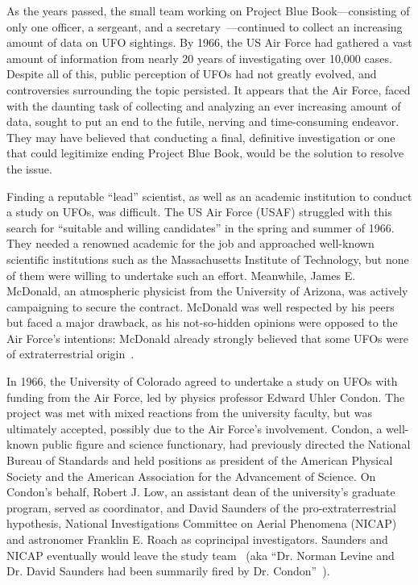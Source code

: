 As the years passed, the small team working on Project Blue Book---consisting of only one officer,
a sergeant, and a secretary~\cite{Condon-report,Condon-report-Bantam,Condon-report-Dutton,BibEntry2023Jan}---continued to collect
an increasing amount of data on UFO sightings. By 1966, the US Air Force had gathered a vast amount of information from nearly 20
years of investigating over 10,000 cases.
Despite all of this,
public perception of UFOs had not greatly evolved, and controversies surrounding the topic persisted.
It appears that the Air Force, faced with the daunting task of collecting and analyzing an ever increasing amount of data,
sought to put an end to the futile, nerving and time-consuming endeavor.
They may have believed that conducting a final, definitive investigation or one that
could legitimize ending Project Blue Book, would be the solution to resolve the issue.

Finding a reputable ``lead'' scientist, as well as an academic institution to conduct a study on UFOs, was
difficult. The US Air Force (USAF) struggled with this search for ``suitable and willing candidates''
in the spring and summer of 1966.
They needed a renowned academic for the job and approached well-known scientific institutions such as
the Massachusetts Institute of Technology, but none of them were willing to undertake such an effort. Meanwhile, James E. McDonald, an atmospheric physicist from the University of Arizona, was actively campaigning to secure the contract. McDonald was well respected by his peers but faced a major drawback, as his not-so-hidden opinions were opposed to the Air Force's intentions: McDonald already strongly believed that some UFOs were of extraterrestrial origin~\cite{Klass2019Apr}.

In 1966, the University of Colorado agreed to undertake a study on UFOs with funding from the Air Force,
led by physics professor Edward Uhler Condon. The project was met with mixed reactions from the university faculty,
but was ultimately accepted, possibly due to the Air Force's involvement.
Condon, a well-known public figure and science functionary, had previously directed the National Bureau of Standards
and held positions as president of the American Physical Society and the American Association for the Advancement of Science.
On Condon's behalf, Robert J. Low, an assistant dean of the university's graduate program,
served as coordinator, and David Saunders of the pro-extraterrestrial hypothesis,
National Investigations Committee on Aerial Phenomena (NICAP) and astronomer Franklin E. Roach as coprincipal investigators.
Saunders and NICAP eventually would leave the study team~\cite{Saunders1968Jan}
(aka ``Dr. Norman Levine and Dr. David Saunders had been summarily fired by Dr. Condon''~\cite[Chapter~11, p.~199]{CraigCondon1995}).

